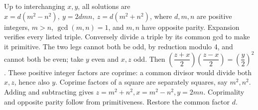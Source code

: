 Up to interchanging $x,y$, all solutions are $\boxed{x=d(m^2-n^2),\ y=2dmn,\ z=d(m^2+n^2)}$, where $d,m,n$ are positive integers, $m>n$, $\gcd(m,n)=1$, and $m,n$ have opposite parity. Expansion verifies every listed triple. Conversely divide a triple by its common gcd to make it primitive. The two legs cannot both be odd, by reduction modulo 4, and cannot both be even; take $y$ even and $x,z$ odd. Then $\left(\dfrac{z+x}{2}\right)\left(\dfrac{z-x}{2}\right)=\left(\dfrac{y}{2}\right)^2$. These positive integer factors are coprime: a common divisor would divide both $x,z$, hence also $y$. Coprime factors of a square are separately squares, say $m^2,n^2$. Adding and subtracting gives $z=m^2+n^2,x=m^2-n^2,y=2mn$. Coprimality and opposite parity follow from primitiveness. Restore the common factor $d$.
